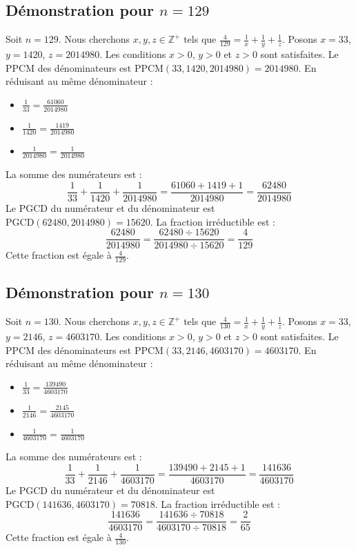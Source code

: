 \documentclass[11pt,a4paper]{article}
\begin{document}
\subsection{Démonstration pour $n = 129$}
Soit $n = 129$. Nous cherchons $x, y, z \in \mathbb{Z}^{+}$ tels que $\frac{4}{129} = \frac{1}{x} + \frac{1}{y} + \frac{1}{z}$.
Posons $x = 33$, $y = 1420$, $z = 2014980$.
Les conditions $x > 0$, $y > 0$ et $z > 0$ sont satisfaites.
Le PPCM des dénominateurs est $\text{PPCM}(33, 1420, 2014980) = 2014980$.
En réduisant au même dénominateur :
\begin{itemize}
    \item $\frac{1}{33} = \frac{61060}{2014980}$
    \item $\frac{1}{1420} = \frac{1419}{2014980}$
    \item $\frac{1}{2014980} = \frac{1}{2014980}$
\end{itemize}
La somme des numérateurs est :
$$ \frac{1}{33} + \frac{1}{1420} + \frac{1}{2014980} = \frac{61060 + 1419 + 1}{2014980} = \frac{62480}{2014980} $$
Le PGCD du numérateur et du dénominateur est $\text{PGCD}(62480, 2014980) = 15620$.
La fraction irréductible est :
$$ \frac{62480}{2014980} = \frac{62480 \div 15620}{2014980 \div 15620} = \frac{4}{129} $$
Cette fraction est égale à $\frac{4}{129}$.

\subsection{Démonstration pour $n = 130$}
Soit $n = 130$. Nous cherchons $x, y, z \in \mathbb{Z}^{+}$ tels que $\frac{4}{130} = \frac{1}{x} + \frac{1}{y} + \frac{1}{z}$.
Posons $x = 33$, $y = 2146$, $z = 4603170$.
Les conditions $x > 0$, $y > 0$ et $z > 0$ sont satisfaites.
Le PPCM des dénominateurs est $\text{PPCM}(33, 2146, 4603170) = 4603170$.
En réduisant au même dénominateur :
\begin{itemize}
    \item $\frac{1}{33} = \frac{139490}{4603170}$
    \item $\frac{1}{2146} = \frac{2145}{4603170}$
    \item $\frac{1}{4603170} = \frac{1}{4603170}$
\end{itemize}
La somme des numérateurs est :
$$ \frac{1}{33} + \frac{1}{2146} + \frac{1}{4603170} = \frac{139490 + 2145 + 1}{4603170} = \frac{141636}{4603170} $$
Le PGCD du numérateur et du dénominateur est $\text{PGCD}(141636, 4603170) = 70818$.
La fraction irréductible est :
$$ \frac{141636}{4603170} = \frac{141636 \div 70818}{4603170 \div 70818} = \frac{2}{65} $$
Cette fraction est égale à $\frac{4}{130}$.
\end{document}
